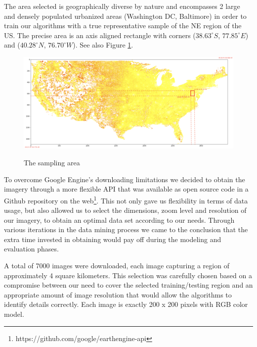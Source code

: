 \documentclass{article}
\begin{document}
The area selected is geographically diverse by nature and encompasses 2 large and densely populated urbanized areas (Washington DC, Baltimore) in order to train our algorithms with a true representative sample of the NE region of the US. The precise area is an axis aligned rectangle with corners ($38.63^\circ S$,  $77.85^\circ E$) and ($40.28^\circ N$, $76.70^\circ W$). See also Figure \ref{fig:training-area}.

\begin{figure}[ht]
\centering
\includegraphics[scale=0.33]{heat_map.png}
\label{fig:training-area}
\caption{The sampling area}
\end{figure}

To overcome Google Engine’s downloading limitations we decided to obtain the imagery through a more flexible API that was available as open source code in a Github repository on the web\footnote{https://github.com/google/earthengine-api}. This not only gave us flexibility in terms of data usage, but also allowed us to select the dimensions, zoom level and resolution of our imagery,  to obtain an optimal data set according to our needs. Through various iterations in the data mining process we came to the conclusion that the extra time invested in obtaining would pay off during the modeling and evaluation phases. 

A total of 7000 images were downloaded, each image capturing a region of approximately 4 square kilometers. This selection was carefully chosen based on a compromise between our need to cover the selected training/testing region and an appropriate amount of image resolution that would allow the algorithms to identify details correctly. Each image is exactly 200 x 200 pixels with RGB color model.
\end{document}
